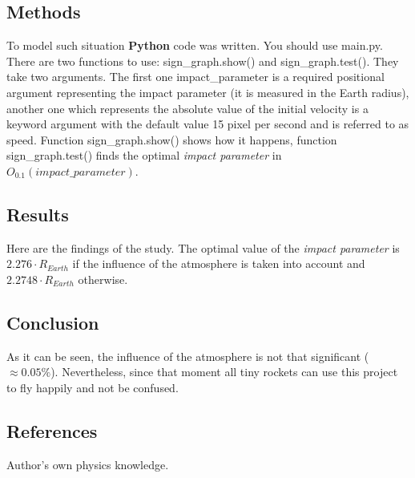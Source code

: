 \documentclass[a4paper,12pt]{article}
\begin{document}
\subsection*{Methods}
To model such situation \textbf{Python} code was written. You should use \colorbox{gray!30}{main.py}. There are two functions to use: \colorbox{gray!30}{sign\_graph.show()} and \colorbox{gray!30}{sign\_graph.test()}. They take two arguments. The first one \colorbox{gray!30}{impact\_parameter} is a required positional argument representing the impact parameter (it is measured in the Earth radius), another one which represents the absolute value of the initial velocity is a keyword argument with the default value 15 pixel per second and is referred to as \colorbox{gray!30}{speed}. Function \colorbox{gray!30}{sign\_graph.show()} shows how it happens, function \colorbox{gray!30}{sign\_graph.test()} finds the optimal \textit{impact parameter} in \textit{$O_{0.1}(impact\_parameter)$}.
\subsection*{Results}
Here are the findings of the study. The optimal value of the \textit{impact parameter} is $2.276 \cdot R_{Earth}$ if the influence of the atmosphere is taken into account and $2.2748 \cdot R_{Earth}$ otherwise.
\subsection*{Conclusion}
As it can be seen, the influence of the atmosphere is not that significant ($\approx 0.05\%$). Nevertheless, since that moment all tiny rockets can use this project to fly happily and not be confused.
\subsection*{References}
Author's own physics knowledge.
\end{document}
